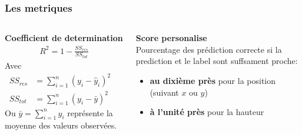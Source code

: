 \begin{frame}
    \frametitle{Les metriques}
    \begin{columns}
        \begin{column}{0.5\textwidth}
            \textbf{Coefficient de determination}
        \begingroup
        \begin{align*}
            R^2 = 1 - \frac{SS_{res}}{SS_{tot}}
            \label{eqn:R2}
        \end{align*}
        Avec
        \scriptsize
        \begin{align*}
            SS_{res} &=  \sum_{i=1}^{n} \left( y_i - \hat{y}_i \right)^2 \quad \\
            SS_{tot} &=  \sum_{i=1}^{n} \left( y_i - \bar{y} \right)^2 
        \end{align*}
        Ou $ \bar{y} = \sum_{i=1}^{n} y_i $ représente la moyenne des valeurs observées.
        \endgroup
        \end{column}
        \begin{column}{0.5\textwidth}
        \textbf{Score personalise}\\
        Pourcentage des prédiction correcte si la prediction et le label sont suffsament proche:
        \begin{itemize}
         \item \textbf{au dixième près} pour la position (suivant $x$ ou $y$) 
         \item \textbf{à l'unité près} pour la hauteur 
        \end{itemize}

        \end{column}
    \end{columns}
\end{frame}



